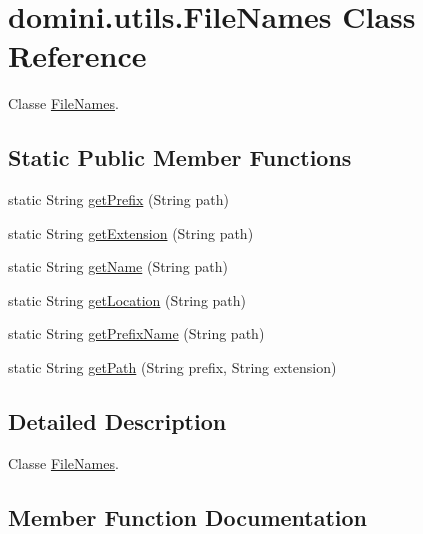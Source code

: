 \hypertarget{classdomini_1_1utils_1_1FileNames}{}\section{domini.\+utils.\+File\+Names Class Reference}
\label{classdomini_1_1utils_1_1FileNames}


Classe \hyperlink{classdomini_1_1utils_1_1FileNames}{File\+Names}.  


\subsection*{Static Public Member Functions}
\begin{DoxyCompactItemize}
\item 
static String \hyperlink{classdomini_1_1utils_1_1FileNames_a217ed1d50727e5109fdbd626a3b5bf07}{get\+Prefix} (String path)
\item 
static String \hyperlink{classdomini_1_1utils_1_1FileNames_af743111d2e036c165270edc4056c19e2}{get\+Extension} (String path)
\item 
static String \hyperlink{classdomini_1_1utils_1_1FileNames_ade42cac265a0eb6d3bbccc671f669253}{get\+Name} (String path)
\item 
static String \hyperlink{classdomini_1_1utils_1_1FileNames_afc75fde5e21552878f174ad4f28fcf21}{get\+Location} (String path)
\item 
static String \hyperlink{classdomini_1_1utils_1_1FileNames_afcfe1e3bb1f49c70807fcd66a21d2b9a}{get\+Prefix\+Name} (String path)
\item 
static String \hyperlink{classdomini_1_1utils_1_1FileNames_a12c91817013f1485a2318621f3fc1312}{get\+Path} (String prefix, String extension)
\end{DoxyCompactItemize}


\subsection{Detailed Description}
Classe \hyperlink{classdomini_1_1utils_1_1FileNames}{File\+Names}. 

\subsection{Member Function Documentation}
\mbox{\label{classdomini_1_1utils_1_1FileNames_af743111d2e036c165270edc4056c19e2}} 
